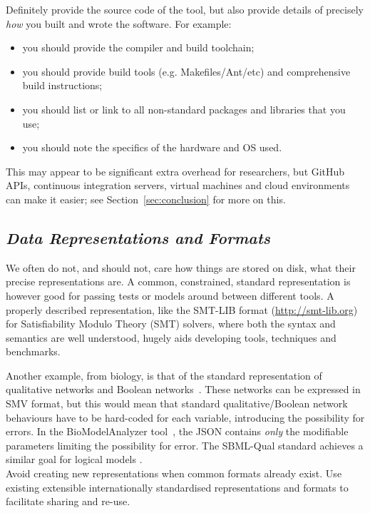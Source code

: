 \documentclass[a4paper,11pt]{article}
\begin{document}
 Definitely provide the
source code of the tool, but also provide
details of precisely \emph{how} you built and wrote the software. For
example:

\begin{itemize}
\item you should provide the compiler and build toolchain; 
\item you should provide build tools (e.g. Makefiles/Ant/etc) and
  comprehensive build instructions; 
\item you should list or link to all non-standard packages and libraries that you use; 
\item you should note the specifics of the hardware and OS used. 
\end{itemize}

This may appear to be significant extra overhead for researchers, but
GitHub APIs, continuous integration servers, virtual machines and
cloud environments can make it easier; see
Section~\ref{sec:conclusion} for more on this.


\subsection{{\emph{Data Representations and Formats}}}

We often do not, and should not, care how things are stored on disk,
what their precise representations are. A common, constrained,
standard representation is however good for passing tests or models around
between different tools. A properly described representation, like the
SMT-LIB format (\url{http://smt-lib.org}) for Satisfiability
Modulo Theory (SMT) solvers, where both the syntax and semantics are
well understood, hugely aids developing tools, techniques and
benchmarks.

Another example, from biology, is that of the standard representation
of qualitative networks and Boolean
networks~\cite{Kauffman1969,Schaub2007}.  These networks can be
expressed in SMV format, but this would mean that standard
qualitative/Boolean network behaviours have to be hard-coded for each
variable, introducing the possibility for errors. In the
BioModelAnalyzer tool~\cite{Benque2012}, the JSON contains \emph{only}
the modifiable parameters limiting the possibility for error. The 
SBML-Qual standard achieves a similar goal for logical models \cite{Chaouiya2013}.\\

 Avoid creating
new representations when common formats already exist. Use existing
extensible internationally standardised representations and formats to
facilitate sharing and re-use.
\end{document}
